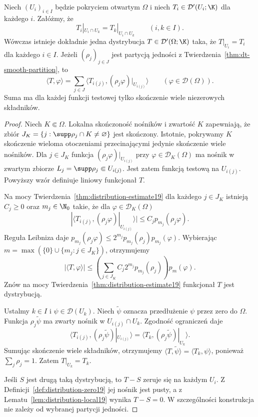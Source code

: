 \begin{twierdzenie}
\label{thm:dt-distributions-gluing}
Niech $(U_i)_{i\in I}$ będzie pokryciem otwartym $\Omega$
i niech $T_i\in\mathcal D'(U_i;\K)$ dla każdego $i$.
Załóżmy, że
\[
 T_i|_{U_i\cap U_k}=T_k|_{U_i\cap U_k}
 \qquad(i,k\in I).
\]
Wówczas istnieje dokładnie jedna dystrybucja
$T\in\mathcal D'(\Omega;\K)$ taka, że $T|_{U_i}=T_i$
dla każdego $i\in I$. Jeżeli $(\rho_j)_{j\in J}$ jest
partycją jedności z Twierdzenia~\ref{thm:dt-smooth-partition},
to
\[
 \langle T,\varphi\rangle
 =\sum_{j\in J}\langle T_{i(j)},
                  (\rho_j\varphi)|_{U_{i(j)}}\rangle
 \qquad(\varphi\in\mathcal D(\Omega)).
\]
Suma ma dla każdej funkcji testowej tylko skończenie
wiele niezerowych składników.
\end{twierdzenie}
\begin{proof}
Niech $K\Subset\Omega$. Lokalna skończoność nośników
i zwartość $K$ zapewniają, że zbiór
$J_K=\{j:\supp\rho_j\cap K\ne\varnothing\}$
jest skończony. Istotnie, pokrywamy $K$ skończenie
wieloma otoczeniami przecinającymi jedynie skończenie
wiele nośników. Dla $j\in J_K$ funkcja
$(\rho_j\varphi)|_{U_{i(j)}}$ przy
$\varphi\in\mathcal D_K(\Omega)$ ma nośnik
w zwartym zbiorze $L_j=\supp\rho_j\Subset U_{i(j)}$.
Jest zatem funkcją testową na $U_{i(j)}$.
Powyższy wzór definiuje liniowy funkcjonał $T$.

Na mocy Twierdzenia~\ref{thm:distribution-estimate19}
dla każdego $j\in J_K$ istnieją $C_j\ge0$ oraz
$m_j\in\N_0$ takie, że dla $\varphi\in\mathcal D_K(\Omega)$
\[
 |\langle T_{i(j)},(\rho_j\varphi)|_{U_{i(j)}}\rangle|
 \le C_j p_{m_j}(\rho_j\varphi).
\]
Reguła Leibniza daje
$p_{m_j}(\rho_j\varphi)\le
2^{m_j}p_{m_j}(\rho_j)p_{m_j}(\varphi)$.
Wybierając $m=\max(\{0\}\cup\{m_j:j\in J_K\})$,
otrzymujemy
\[
 |\langle T,\varphi\rangle|
 \le\left(\sum_{j\in J_K} C_j2^{m_j}p_{m_j}(\rho_j)\right)
       p_m(\varphi).
\]
Znów na mocy Twierdzenia~\ref{thm:distribution-estimate19}
funkcjonał $T$ jest dystrybucją.

Ustalmy $k\in I$ i $\psi\in\mathcal D(U_k)$.
Niech $\widetilde\psi$ oznacza przedłużenie $\psi$ przez zero
do $\Omega$. Funkcja $\rho_j\widetilde\psi$ ma zwarty
nośnik w $U_{i(j)}\cap U_k$. Zgodność ograniczeń daje
\[
 \langle T_{i(j)},(\rho_j\widetilde\psi)|_{U_{i(j)}}\rangle
 =\langle T_k,(\rho_j\widetilde\psi)|_{U_k}\rangle.
\]
Sumując skończenie wiele składników, otrzymujemy
$\langle T,\widetilde\psi\rangle=\langle T_k,\psi\rangle$,
ponieważ $\sum_j\rho_j=1$. Zatem $T|_{U_k}=T_k$.

Jeśli $S$ jest drugą taką dystrybucją, to $T-S$ zeruje
się na każdym $U_i$. Z Definicji~\ref{def:distribution-zero19}
jej nośnik jest pusty, a z
Lematu~\ref{lem:distribution-local19} wynika $T-S=0$.
W szczególności konstrukcja nie zależy od wybranej
partycji jedności.
\end{proof}

